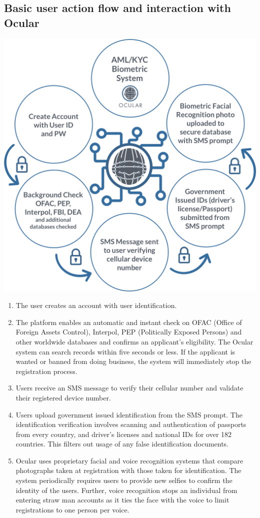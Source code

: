 \documentclass[a4paper]{article}
\begin{document}
\subsection{Basic user action flow and interaction with Ocular}
\centerline{\includegraphics[width=1.1\textwidth]{biometric2}}
\begin{enumerate}
\item The user creates an account with user identification.
\item The platform enables an automatic and instant check on OFAC (Office of Foreign Assets Control), Interpol, PEP (Politically Exposed Persons) and other worldwide databases and confirms an applicant’s eligibility. The Ocular system can search records within five seconds or less. If the applicant is wanted or banned from doing business, the system will immediately stop the registration process.
\item Users receive an SMS message to verify their cellular number and validate their registered device number.
\item Users upload government issued identification from the SMS prompt. The identification verification involves scanning and authentication of passports from every country, and driver's licenses and national IDs for over 182 countries. This filters out usage of any false identification documents.
\item Ocular uses proprietary facial and voice recognition systems that compare photographs taken at registration with those taken for identification. The system periodically requires users to provide new selfies to confirm the identity of the users. Further, voice recognition stops an individual from entering straw man accounts as it ties the face with the voice to limit registrations to one person per voice.
\end{enumerate}
\end{document}
